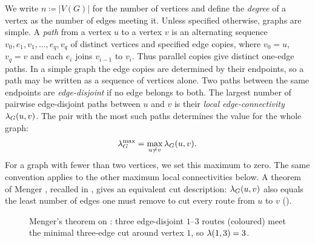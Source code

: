 We write $n\coloneq|V(G)|$ for the number of vertices and define the \emph{degree} of a vertex as the number of edges meeting it.
Unless specified otherwise, graphs are simple.
A \emph{path} from a vertex $u$ to a vertex $v$ is an alternating sequence
$v_0,e_1,v_1,\ldots,e_q,v_q$ of distinct vertices and specified edge copies,
where $v_0=u$, $v_q=v$ and each $e_i$ joins $v_{i-1}$ to $v_i$. Thus parallel
copies give distinct one-edge paths. In a simple graph the edge copies are
determined by their endpoints, so a path may be written as a sequence of
vertices alone.
Two paths between the same endpoints are \emph{edge-disjoint} if no edge belongs to both.
The largest number of pairwise edge-disjoint paths between $u$ and $v$ is their \emph{local edge-connectivity} $\lambda_G(u, v)$.
The pair with the most such paths determines the value for the whole graph:
\[
    \lambda_G^{\max} = \max_{u \ne v} \lambda_G(u, v).
\]
For a graph with fewer than two vertices, we set this maximum to zero.
The same convention applies to the other maximum local connectivities below.
A theorem of Menger \cite{Menger27}, recalled in , gives an equivalent cut description: $\lambda_G(u, v)$ also equals the least number of edges one must remove to cut every route from $u$ to $v$ ().

\begin{figure}[ht]
\centering
{}
\caption{Menger's theorem on : three edge-disjoint $1$--$3$ routes (coloured) meet the minimal three-edge cut around vertex $1$, so $\lambda(1,3)=3$.}
\label{fig:menger}
\end{figure}

